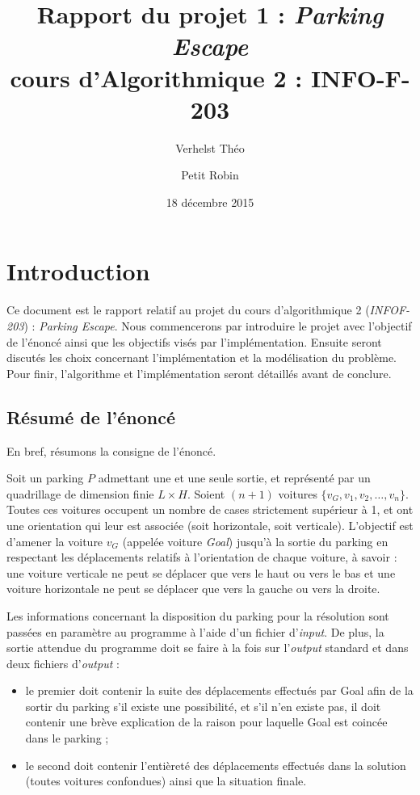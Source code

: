 \documentclass{article}
\title{Rapport du projet 1 : \textit{Parking Escape}\\cours d'Algorithmique 2 : INFO-F-203}
\author{Verhelst Théo \and Petit Robin}
\date{18 décembre 2015}
\begin{document}
\maketitle
\tableofcontents
\newpage
{}

\section{Introduction}
	Ce document est le rapport relatif au projet du cours d'algorithmique 2 (\textit{INFOF-203}) : \textit{Parking Escape}. Nous commencerons par
	introduire le projet avec l'objectif de l'énoncé ainsi que les objectifs visés par l'implémentation. Ensuite seront discutés les choix concernant
	l'implémentation et la modélisation du problème. Pour finir, l'algorithme et l'implémentation seront détaillés avant de conclure.

	\subsection{Résumé de l'énoncé}
		En bref, résumons la consigne de l'énoncé.

		Soit un parking $P$ admettant une et une seule sortie, et représenté par un quadrillage de dimension finie $L\times H$. Soient $(n+1)$ voitures
		$\{v_G, v_1, v_2, \ldots, v_n\}$. Toutes ces voitures occupent un nombre de cases strictement supérieur à 1, et ont une
		orientation qui leur est associée (soit horizontale, soit verticale). L'objectif est d'amener la voiture $v_G$ (appelée voiture \textit{Goal})
		jusqu'à la sortie du parking en respectant les déplacements relatifs à l'orientation de chaque voiture, à savoir : une voiture verticale ne peut
		se déplacer que vers le haut ou vers le bas et une voiture horizontale ne peut se déplacer que vers la gauche ou vers la droite.

		Les informations concernant la disposition du parking pour la résolution sont passées en paramètre au programme à l'aide d'un fichier d'\textit{input}.
		De plus, la sortie attendue du programme doit se faire à la fois sur l'\textit{output} standard et dans deux fichiers d'\textit{output} :

		\begin{itemize}
			\item le premier doit contenir la suite des déplacements effectués par Goal afin de la sortir du parking
				  s'il existe une possibilité, et s'il n'en existe pas, il doit contenir une brève explication de la raison pour
				  laquelle Goal est coincée dans le parking ;
			\item le second doit contenir l'entièreté des déplacements effectués dans la solution (toutes voitures confondues)
				  ainsi que la situation finale.
		\end{itemize}
\end{document}
